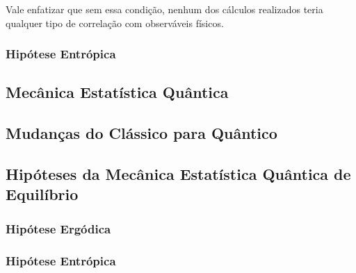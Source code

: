 \documentclass[twoside,reqno]{amsart}
\numberwithin{equation}{section}
\begin{document}
\begin{refsection}
Vale enfatizar que sem essa condição, nenhum dos cálculos realizados teria qualquer tipo de correlação com 
observáveis físicos.

\subsubsection{Hipótese Entrópica}

\printbibliography[heading=subbibliography]
\end{refsection}


\begin{refsection}
\section{Mecânica Estatística Quântica}

\subsection{Mudanças do Clássico para Quântico}

\subsection{Hipóteses da Mecânica Estatística Quântica de Equilíbrio}

\subsubsection{Hipótese Ergódica}

\subsubsection{Hipótese Entrópica}

\printbibliography[heading=subbibliography]
\end{refsection}

\end{document}

